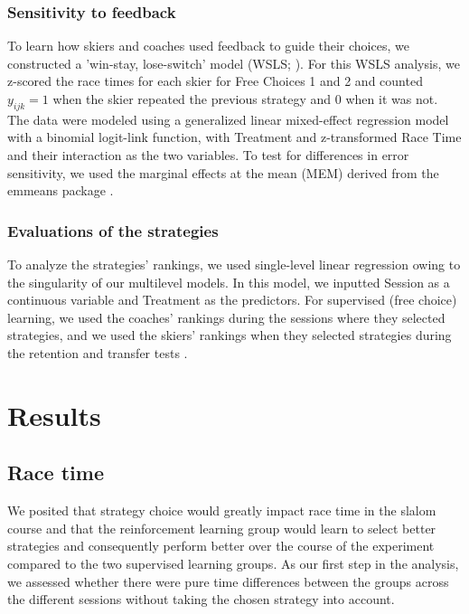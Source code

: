 \documentclass[pdflatex,sn-mathphys-num]{sn-jnl}%
\theoremstyle{thmstyleone}%
\theoremstyle{thmstyletwo}%
\theoremstyle{thmstylethree}%
\begin{document}
\subsubsection{Sensitivity to feedback}

To learn how skiers and coaches used feedback to guide their choices, we constructed a 'win-stay, lose-switch' model (WSLS; \cite{nowak_strategy_1993, worthy_comparison_2014, iyer_probing_2020}). For this WSLS analysis, we z-scored the race times for each skier for Free Choices 1 and 2 and counted \(y_{ijk}=1\) when the skier repeated the previous strategy and 0 when it was not. The data were modeled using a generalized linear mixed-effect regression model with a binomial logit-link function, with Treatment and z-transformed Race Time and their interaction as the two variables. To test for differences in error sensitivity, we used the marginal effects at the mean (MEM) derived from the emmeans package \cite{lenth_emmeans_2023}.


\subsubsection{Evaluations of the strategies}
To analyze the strategies' rankings, we used single-level linear regression owing to the singularity of our multilevel models. In this model, we inputted Session as a continuous variable and Treatment as the predictors. For supervised (free choice) learning, we used the coaches' rankings during the sessions where they selected strategies, and we used the skiers' rankings when they selected strategies during the retention and transfer tests .



\section{Results}


\subsection{Race time}\label{result_racetime}
We posited that strategy choice would greatly impact race time in the slalom course and that the reinforcement learning group would learn to select better strategies and consequently perform better over the course of the experiment compared to the two supervised learning groups. As our first step in the analysis, we assessed whether there were pure time differences between the groups across the different sessions without taking the chosen strategy into account. 
\end{document}
